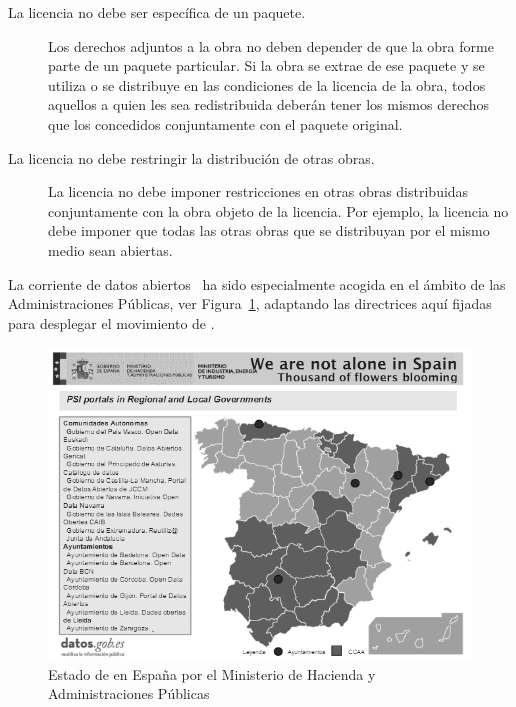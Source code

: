 \begin{description}
 \item [La licencia no debe ser específica de un paquete.] Los derechos adjuntos a la obra no deben depender de que la obra forme parte de un paquete particular. Si la obra se extrae de ese paquete y se utiliza o se distribuye en las condiciones de la licencia de la obra, todos aquellos a quien les sea redistribuida deberán tener los mismos derechos que los concedidos conjuntamente con el paquete original.
 \item [La licencia no debe restringir la distribución de otras obras.] La licencia no debe imponer restricciones en otras obras distribuidas conjuntamente con la obra objeto de la licencia. Por ejemplo, la licencia no debe imponer que todas las otras obras que se distribuyan por el mismo medio sean abiertas.
\end{description}

La corriente de datos abiertos~\cite{odfn} ha sido especialmente acogida en el ámbito de las Administraciones
Públicas, ver Figura~\ref{fig:od-spain}, adaptando las directrices aquí fijadas para desplegar el movimiento
de \ogd. 

\begin{figure}[!htb]
\centering
	\includegraphics[width=14cm]{images/phd/open-data-spain}
\caption{Estado de \opendata en España por el Ministerio de Hacienda y Administraciones Públicas}
\label{fig:od-spain}
\end{figure}


